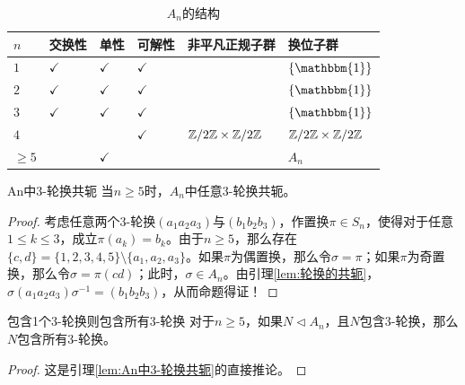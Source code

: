 \begin{table}[H]
	\centering
	\caption{$A_n$的结构}
	\begin{tabular}{|>{\centering\arraybackslash}m{1cm}|>{\centering\arraybackslash}m{1.5cm}|>{\centering\arraybackslash}m{1cm}|>{\centering\arraybackslash}m{1.5cm}|>{\centering\arraybackslash}m{3cm}|>{\centering\arraybackslash}m{2cm}|}
		\hline
		$n$     & \textbf{交换性} & \textbf{单性} & \textbf{可解性}      & \textbf{非平凡正规子群} & \textbf{换位子群}    \\
		\hline
		$1$     & $\checkmark$    & $\checkmark$ & $\checkmark$         &                       & $\{\mathbbm{1}\}$    \\
		\hline
		$2$     & $\checkmark$    & $\checkmark$ & $\checkmark$         &                       & $\{\mathbbm{1}\}$    \\
		\hline
		$3$     & $\checkmark$    & $\checkmark$ & $\checkmark$         &                       & $\{\mathbbm{1}\}$    \\
		\hline
		$4$     &                 &              & $\checkmark$         & $\mathbb{Z}/2\mathbb{Z}\times\mathbb{Z}/2\mathbb{Z}$  & $\mathbb{Z}/2\mathbb{Z}\times\mathbb{Z}/2\mathbb{Z}$ \\
		\hline
		$\ge 5$ &                 & $\checkmark$ &                      &                       & $A_n$                \\   
		\hline
	\end{tabular}
\end{table}

\begin{lemma}{}{An中3-轮换共轭}
	当$n\ge 5$时，$A_n$中任意$3$-轮换共轭。
\end{lemma}

\begin{proof}
	考虑任意两个$3$-轮换$(a_1a_2a_3)$与$(b_1b_2b_3)$，作置换$\pi\in S_n$，使得对于任意$1\le k\le 3$，成立$\pi(a_k)=b_k$。由于$n\ge 5$，那么存在$\{ c,d \}=\{1,2,3,4,5\}\setminus\{a_1,a_2,a_3\}$。如果$\pi$为偶置换，那么令$\sigma=\pi$；如果$\pi$为奇置换，那么令$\sigma=\pi(cd)$；此时，$\sigma\in A_n$。由引理\ref{lem:轮换的共轭}，$\sigma(a_1a_2a_3)\sigma^{-1}=(b_1b_2b_3)$，从而命题得证！
\end{proof}

\begin{lemma}{}{包含1个3-轮换则包含所有3-轮换}
	对于$n\ge 5$，如果$N\lhd A_n$，且$N$包含$3$-轮换，那么$N$包含所有$3$-轮换。
\end{lemma}

\begin{proof}
	这是引理\ref{lem:An中3-轮换共轭}的直接推论。
\end{proof}

